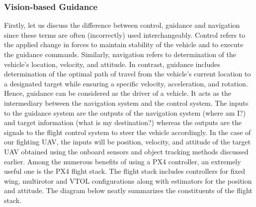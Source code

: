 \documentclass[12pt]{article}
\begin{document}
\subsubsection{Vision-based Guidance}
\justify Firstly, let us discuss the difference between control, guidance and navigation since these terms are often (incorrectly) used interchangeably. Control refers to the applied change in forces to maintain stability of the vehicle and to execute the guidance commands. Similarly, navigation refers to determination of the vehicle’s location, velocity, and attitude. In contrast, guidance includes determination of the optimal path of travel from the vehicle’s current location to a designated target while ensuring a specific velocity, acceleration, and rotation.
\justify Hence, guidance can be considered as the driver of a vehicle. It acts as the intermediary between the navigation system and the control system. The inputs to the guidance system are the outputs of the navigation system (where am I?) and target information (what is my destination?) whereas the outputs are the signals to the flight control system to steer the vehicle accordingly. In the case of our fighting UAV, the inputs will be position, velocity, and attitude of the target UAV obtained using the onboard sensors and object tracking methods discussed earlier. 
\justify Among the numerous benefits of using a PX4 controller, an extremely useful one is the PX4 flight stack. The flight stack includes controllers for fixed wing, multirotor and VTOL configurations along with estimators for the position and attitude. The diagram below neatly summarizes the constituents of the flight stack.
\end{document}
